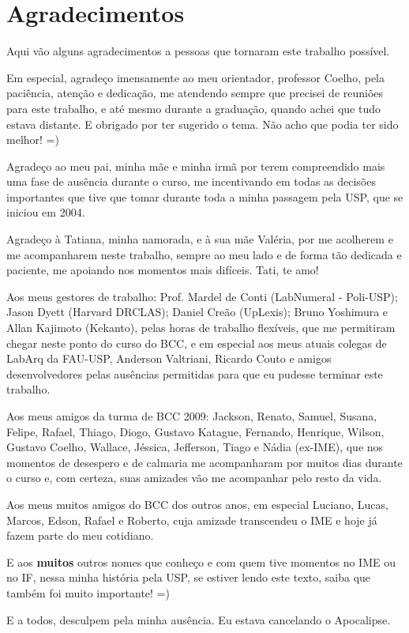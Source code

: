 
\newpage
\section*{Agradecimentos}

Aqui vão alguns agradecimentos a pessoas que tornaram este trabalho possível.

Em especial, agradeço imensamente ao meu orientador, professor Coelho, pela paciência,
atenção e dedicação, me atendendo sempre que precisei de reuniões para este trabalho, e
até mesmo durante a graduação, quando achei que tudo estava distante. E obrigado por
ter sugerido o tema. Não acho que podia ter sido melhor! =)

Agradeço ao meu pai, minha mãe e minha irmã por terem compreendido mais uma fase de
ausência durante o curso, me incentivando em todas as decisões importantes que tive que
tomar durante toda a minha passagem pela USP, que se iniciou em 2004.

Agradeço à Tatiana, minha namorada, e à sua mãe Valéria, por me acolherem e me
acompanharem neste trabalho, sempre ao meu lado e de forma tão dedicada e paciente, me
apoiando nos momentos mais difíceis. Tati, te amo!

Aos meus gestores de trabalho: Prof. Mardel de Conti (LabNumeral - Poli-USP); Jason
Dyett (Harvard DRCLAS); Daniel Creão (UpLexis); Bruno Yoshimura e Allan Kajimoto
(Kekanto), pelas horas de trabalho flexíveis, que me permitiram chegar neste ponto do
curso do BCC, e em especial aos meus atuais colegas de LabArq da FAU-USP, Anderson
Valtriani, Ricardo Couto e amigos desenvolvedores pelas ausências permitidas para que
eu pudesse terminar este trabalho.

Aos meus amigos da turma de BCC 2009: Jackson, Renato, Samuel, Susana, Felipe, Rafael,
Thiago, Diogo, Gustavo Katague, Fernando, Henrique, Wilson, Gustavo Coelho, Wallace,
Jéssica, Jefferson, Tiago e Nádia (ex-IME), que nos momentos de desespero e de calmaria
me acompanharam por muitos dias durante o curso e, com certeza, suas amizades vão me
acompanhar pelo resto da vida.

Aos meus muitos amigos do BCC dos outros anos, em especial Luciano, Lucas, Marcos,
Edson, Rafael e Roberto, cuja amizade transcendeu o IME e hoje já fazem parte do meu
cotidiano.

E aos \textbf{muitos} outros nomes que conheço e com quem tive momentos no IME ou no
IF, nessa minha história pela USP, se estiver lendo este texto, saiba que também foi
muito importante! =)

E a todos, desculpem pela minha ausência. Eu estava cancelando o Apocalipse.

\afterpage{\clearpage}